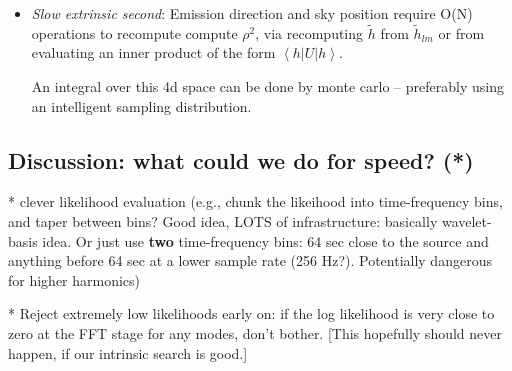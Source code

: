 \documentclass[twocolumn,prd,nofootinbib]{revtex4}
\newcommand\qmoperatorelement[3]{\left\langle#1\left|#2\right|#3\right\rangle}
\begin{document}
\begin{widetext}
{\begin{itemize}
\begin{shaded}
    Given these two terms, we compute an ``easy'' integral,
where every term in the integrand can be computed from a quick interpolation over a well-sampled, low-dimensional function:
\begin{eqnarray}
L_{red,EZ} \equiv \int \frac{dt}{T_{\rm window}} \frac{d\psi}{\pi} \frac{dr}{r_{\rm max}^3/3}e^{\ln  L}
\end{eqnarray}
\end{shaded}

\item \emph{Slow extrinsic second}: Emission direction and sky position require O(N) operations to recompute compute
  $\rho^2$, via recomputing $\tilde{h}$ from $\tilde{h}_{lm}$ or from evaluating an inner product of the form
  $\qmoperatorelement{h}{U}{h}$.    

An integral over this 4d space can be done by monte carlo -- preferably using an intelligent sampling distribution.

\end{itemize}
}


\end{widetext}


\subsection{Discussion: what could we do for speed? (*)}


* clever likelihood evaluation (e.g., chunk the likeihood into time-frequency bins, and taper between bins? Good idea,
LOTS of infrastructure: basically wavelet-basis idea.  Or just use \textbf{two} time-frequency bins: 64 sec close to the
source and anything before 64 sec at a lower sample rate (256 Hz?).  Potentially dangerous for higher harmonics)

* Reject extremely low likelihoods early on: if the log likelihood is very close to zero at the FFT stage for any modes,
don't bother.  [This hopefully should never happen, if our intrinsic search is good.]
\end{document}
